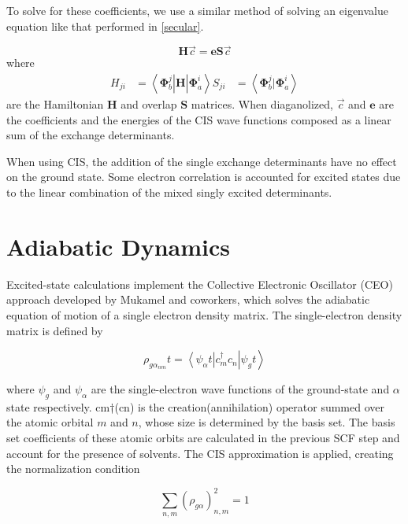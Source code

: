     To solve for these coefficients, we use a similar method of solving an eigenvalue equation like that performed in \ref{secular}.

    \begin{equation}
      \bm{H}\vec{c} = \bm{e} \bm{S} \vec{c}
    \end{equation}
    where
    \begin{align}
      H_{ji} &= \left<\bm{\Phi}_b^j \right| \bm{H} \left| \bm{\Phi}_a^i \right>
      S_{ji} &= \left<\bm{\Phi}_b^j | \bm{\Phi}_a^i \right>
    \end{align}
    are the Hamiltonian \(\bm{H}\) and overlap \(\bm{S}\) matrices.
    When diaganolized, \(\vec{c}\) and \(\bm{e}\) are the coefficients and the energies of the CIS wave functions composed as a linear sum of the exchange determinants.

    When using CIS, the addition of the single exchange determinants have no effect on the ground state.
    Some electron correlation is accounted for excited states due to the linear combination of the mixed singly excited determinants.

\section{Adiabatic Dynamics}
	Excited-state calculations implement the Collective Electronic Oscillator (CEO) approach developed by Mukamel and coworkers, which solves the adiabatic equation of motion of a single electron density matrix.
	The single-electron density matrix is defined by  

    \begin{equation}
	\rho_{g\alpha_{nm}}t = \left< \psi_\alpha t \right| c_m^\dagger c_n \left | \psi_g t \right>
    \end{equation}

    where \(\psi_g\) and \(\psi_\alpha\) are the single-electron wave functions of the ground-state and \(\alpha\) state respectively.
    cm†(cn) is the creation(annihilation) operator summed over the atomic orbital \(m\) and \(n\), whose size is determined by the basis set.
    The basis set coefficients of these atomic orbits are calculated in the previous SCF step and account for the presence of solvents.
    The CIS approximation is applied, creating the normalization condition 

    \begin{equation}
	\sum_{n,m} (\rho_{g\alpha})^2_{n,m} = 1
    \end{equation}

